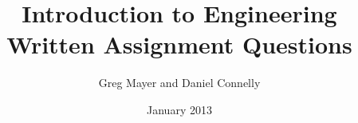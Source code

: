 
\usepackage[utf8]{inputenc}
\usepackage{amsmath}
\usepackage{amssymb} %
\usepackage{graphicx} %
\usepackage{color}
\usepackage[usenames,dvipsnames]{xcolor}
\usepackage{hyperref} %
\usepackage{float} %
\title{ Introduction to Engineering Written Assignment Questions}
\date{January 2013}
\author{Greg Mayer and Daniel Connelly}
\usepackage{fancyheadings}
\pagestyle{myheadings} %
\fancyhead{} %
\renewcommand{\subsectionmark}[1]{\markright{{\color{DGrey}\thesubsection} \ {\color{DGrey}#1}}}
\fancyhead[LE,LO]{\subsectionmark} %


\usepackage{enumitem}   %
\usepackage{anysize}
\marginsize{2.5cm}{2.5cm}{1cm}{1cm}
\newcommand{\Emph}[1]{\textbf{#1}} %
\newcommand{\R}{\mathbb{R}} 
\newcommand{\BM}{\begin{bmatrix}} %
\newcommand{\EM}{\end{bmatrix}} %
\newcommand{\BEN}{\begin{enumerate}[leftmargin=1.1cm]}%
\newcommand{\EEN}{\end{enumerate}} %
\newcommand{\MB}{\mathbf} %

\newcommand{\px}{\frac{\partial}{\partial x}} %
\newcommand{\py}{\frac{\partial}{\partial y}} %


